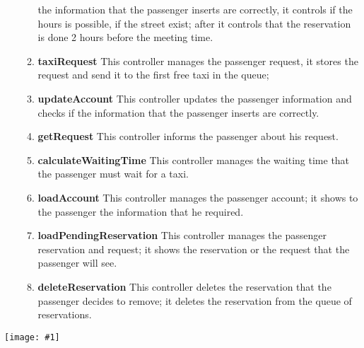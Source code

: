\documentclass[11pt, a4paper,titlepage]{article}
\newcommand{\image}[1]{
	\begin{center}
		\noindent \texttt{[image: \#1]}
	\end{center}
	}
\begin{document}
\begin{enumerate}
\begin{enumerate}
		the information that the passenger inserts are correctly, it controls if the hours is possible, if the street exist; after it controls that the reservation is done 2 hours before the meeting time.
		\item \textbf{taxiRequest} This controller manages the passenger request, it stores the request 
		and send it to the first free taxi in the queue;
		\item \textbf{updateAccount} This controller updates the passenger information and checks if 
		the information that the passenger inserts are correctly.
		\item \textbf{getRequest} This controller informs the passenger about his request.
		\item \textbf{calculateWaitingTime} This controller manages the waiting time that the passenger must wait for a taxi.
		\item \textbf{loadAccount} This controller manages the passenger account; it shows to the 
		passenger the information that he required.
		\item \textbf{loadPendingReservation} This controller manages the passenger reservation and request; it shows the reservation or the request that the passenger will see.
		\item \textbf{deleteReservation} This controller deletes the reservation that the passenger decides to remove; it deletes the reservation from the queue of reservations.
	\end{enumerate}
\end{enumerate}
\image{BCEPassenger.png}
\newpage
\end{document}
